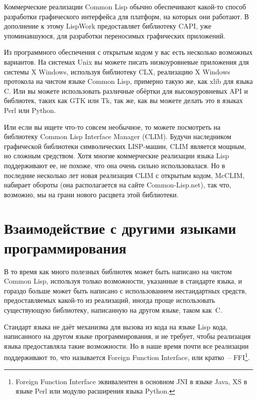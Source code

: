 Коммерческие реализации Common Lisp обычно обеспечивают какой-то способ разработки
графического интерфейса для платформ, на которых они работают. В дополнение к этому
LispWork предоставляет библиотеку CAPI, уже упоминавшуюся, для разработки переносимых
графических приложений.

Из программного обеспечения с открытым кодом у вас есть несколько возможных вариантов. На
системах Unix вы можете писать низкоуровневые приложения для системы X Windows, используя
библиотеку CLX, реализацию X Windows протокола на чистом языке Common Lisp, примерно такую
же, как xlib для языка C. Или вы можете использовать различные обёртки для высокоуровневых
API и библиотек, таких как GTK или Tk, так же, как вы можете делать это в языках Perl или
Python.

Или если вы ищете что-то совсем необычное, то можете посмотреть на библиотеку Common
Lisp Interface Manager (CLIM). Будучи наследником графической библиотеки символических
LISP-машин, CLIM является мощным, но сложным средством. Хотя многие коммерческие
реализации языка Lisp поддерживают ее, не похоже, что она очень сильно использовалася. Но в
последние несколько лет новая реализация CLIM с открытым кодом, McCLIM, набирает обороты
(она располагается на сайте Common-Lisp.net), так что, возможно, мы на грани нового расцвета
этой библиотеки.

\section{Взаимодействие с другими языками программирования}

В то время как много полезных библиотек может быть написано на чистом Common Lisp,
используя только возможности, указанные в стандарте языка, и гораздо больше может быть
написано с использованием нестандартных средств, предоставляемых какой-то из реализаций,
иногда проще использовать существующую библиотеку, написанную на другом языке, таком
как~C.

Стандарт языка не даёт механизма для вызова из кода на языке Lisp кода, написанного на
другом языке программирования, и не требует, чтобы реализация языка предоставляла такие
возможности. Но в наше время почти все реализации поддерживают то, что называется Foreign
Function Interface, или кратко~-- FFI\footnote{Foreign Function Interface эквивалентен в
  основном JNI в языке Java, XS в языке Perl или модулю расширения языка Python.}.


